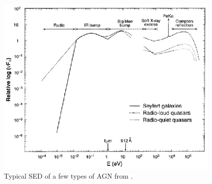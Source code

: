  \begin{figure}
 \centering
 \includegraphics[width=11cm]{Chapter1_intro/agnsed.ps}
    \caption{Typical SED of a few types of AGN from \cite{beckmann12}.}
 \label{sec1:fig_sed}
 \end{figure}


